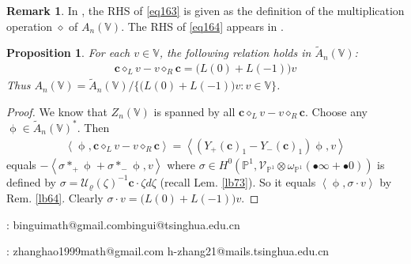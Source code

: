 \documentclass[11pt,b5paper,notitlepage]{article}
\theoremstyle{definition}
\newtheorem{rem}[df]{Remark}
\theoremstyle{plain}
\newtheorem{pp}[df]{Proposition}
\newcommand{\mc}{\mathcal}
\newcommand{\wtd}{\widetilde}
\newcommand{\scr}{\mathscr}
\newcommand{\blt}{\bullet}
\newcommand{\Vbb}{\mathbb V}
\newcommand{\Pbb}{\mathbb P}
\newcommand{\cbf}{\mathbf c}
\newcommand{\<}{\left\langle}
\renewcommand{\>}{\right\rangle}
\numberwithin{equation}{section}
\begin{document}
\begin{rem}
In \cite{DLM-Zhu}, the RHS of \eqref{eq163} is given as the definition of the multiplication operation $\diamond$ of $A_n(\Vbb)$. The RHS of \eqref{eq164} appears in \cite[Lem. 2.1-(ii)]{DLM-Zhu}.
\end{rem}



\begin{pp}
For each $v\in\Vbb$, the following relation holds in $\wtd A_n(\Vbb)$:
\begin{gather}
\cbf\diamond_L v-v\diamond_R\cbf=\big(L(0)+L(-1)\big)v
\end{gather}
Thus $A_n(\Vbb)=\wtd A_n(\Vbb)/\{\big(L(0)+L(-1)\big)v:v\in\Vbb\}$.
\end{pp}

\begin{proof}
We know that $Z_n(\Vbb)$ is spanned by all $\cbf\diamond_L v-v\diamond_R\cbf$. Choose any $\upphi\in\wtd A_n(\Vbb)^*$. Then
\begin{align*}
\<\upphi,\cbf\diamond_L v-v\diamond_R\cbf\>=\<(Y_+(\cbf)_1-Y_-(\cbf)_1)\upphi,v \>
\end{align*}
equals $-\<\sigma*_+\upphi+\sigma*_-\upphi,v\>$ where $\sigma\in H^0(\Pbb^1,\scr V_{\Pbb^1}\otimes\omega_{\Pbb^1}(\blt\infty+\blt 0))$ is defined by $\sigma=\mc U_\varrho(\zeta)^{-1}\cbf \cdot \zeta d\zeta$ (recall Lem. \ref{lb73}). So it equals $\<\upphi,\sigma\cdot v\>$ by Rem. \ref{lb64}. Clearly $\sigma\cdot v=\big(L(0)+L(-1)\big)v$.
\end{proof}








\printindex	
\footnotesize
	
    


: binguimath@gmail.com\qquad bingui@tsinghua.edu.cn\\


: zhanghao1999math@gmail.com \qquad h-zhang21@mails.tsinghua.edu.cn
\end{document}
